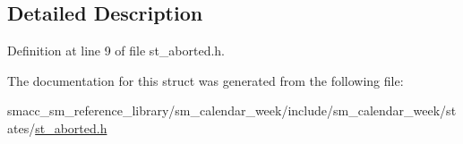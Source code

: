 \subsection{Detailed Description}


Definition at line 9 of file st\+\_\+aborted.\+h.



The documentation for this struct was generated from the following file\+:\begin{DoxyCompactItemize}
\item 
smacc\+\_\+sm\+\_\+reference\+\_\+library/sm\+\_\+calendar\+\_\+week/include/sm\+\_\+calendar\+\_\+week/states/\hyperlink{sm__calendar__week_2include_2sm__calendar__week_2states_2st__aborted_8h}{st\+\_\+aborted.\+h}\end{DoxyCompactItemize}
